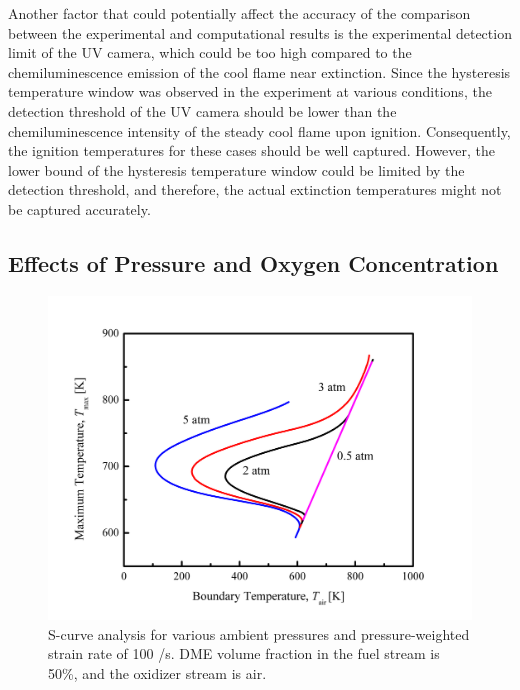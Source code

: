 Another factor that could potentially affect the accuracy of the comparison between the experimental and computational results is the experimental detection limit of the UV camera, which could be too high compared to the chemiluminescence emission of the cool flame near extinction.  Since the hysteresis temperature window was observed in the experiment at various conditions, the detection threshold of the UV camera should be lower than the chemiluminescence intensity of the steady cool flame upon ignition.  Consequently, the ignition temperatures for these cases should be well captured.  However, the lower bound of the hysteresis temperature window could be limited by the detection threshold, and therefore, the actual extinction temperatures might not be captured accurately.

\subsection{Effects of Pressure and Oxygen Concentration}

\begin{figure}[t]
  \centering
  \scriptsize
  \includegraphics[width=1.0\textwidth]{ch-NTC/eff_P.png}
  \normalsize
  \caption{S-curve analysis for various ambient pressures and pressure-weighted strain rate of 100 /s.  DME volume fraction in the fuel stream is 50\%, and the oxidizer stream is air.}
  \label{fig:eff_P}
\end{figure}

